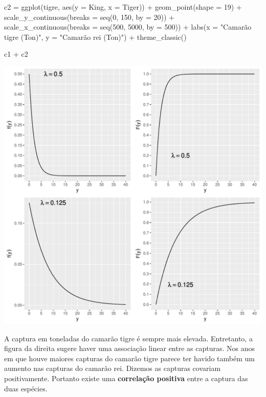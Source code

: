\documentclass[
]{book}
\newenvironment{Shaded}{\begin{snugshade}}{\end{snugshade}}
\newcommand{\AttributeTok}[1]{\textcolor[rgb]{0.77,0.63,0.00}{#1}}
\newcommand{\DecValTok}[1]{\textcolor[rgb]{0.00,0.00,0.81}{#1}}
\newcommand{\FunctionTok}[1]{\textcolor[rgb]{0.00,0.00,0.00}{#1}}
\newcommand{\NormalTok}[1]{#1}
\newcommand{\OtherTok}[1]{\textcolor[rgb]{0.56,0.35,0.01}{#1}}
\newcommand{\SpecialCharTok}[1]{\textcolor[rgb]{0.00,0.00,0.00}{#1}}
\newcommand{\StringTok}[1]{\textcolor[rgb]{0.31,0.60,0.02}{#1}}
\begin{document}
\begin{Shaded}
\begin{Highlighting}[]
\NormalTok{c2 }\OtherTok{=} \FunctionTok{ggplot}\NormalTok{(tigre, }\FunctionTok{aes}\NormalTok{(}\AttributeTok{y =}\NormalTok{ King, }\AttributeTok{x =}\NormalTok{ Tiger)) }\SpecialCharTok{+}
  \FunctionTok{geom\_point}\NormalTok{(}\AttributeTok{shape =} \DecValTok{19}\NormalTok{) }\SpecialCharTok{+}
  \FunctionTok{scale\_y\_continuous}\NormalTok{(}\AttributeTok{breaks =} \FunctionTok{seq}\NormalTok{(}\DecValTok{0}\NormalTok{, }\DecValTok{150}\NormalTok{, }\AttributeTok{by =} \DecValTok{20}\NormalTok{)) }\SpecialCharTok{+}
  \FunctionTok{scale\_x\_continuous}\NormalTok{(}\AttributeTok{breaks =} \FunctionTok{seq}\NormalTok{(}\DecValTok{500}\NormalTok{, }\DecValTok{5000}\NormalTok{, }\AttributeTok{by =} \DecValTok{500}\NormalTok{)) }\SpecialCharTok{+}
  \FunctionTok{labs}\NormalTok{(}\AttributeTok{x =} \StringTok{"Camarão tigre (Ton)"}\NormalTok{, }\AttributeTok{y =} \StringTok{"Camarão rei  (Ton)"}\NormalTok{) }\SpecialCharTok{+}
  \FunctionTok{theme\_classic}\NormalTok{()}

\NormalTok{c1 }\SpecialCharTok{+}\NormalTok{ c2}
\end{Highlighting}
\end{Shaded}

\includegraphics{probest-cambientais_files/figure-latex/unnamed-chunk-207-1.pdf}

A captura em toneladas do camarão tigre é sempre mais elevada. Entretanto, a figura da direita sugere haver uma associação linear entre as capturas. Nos anos em que houve maiores capturas do camarão tigre parece ter havido também um aumento nas capturas do camarão rei. Dizemos as capturas covariam positivamente. Portanto existe uma \textbf{correlação positiva} entre a captura das duas espécies.
\end{document}
